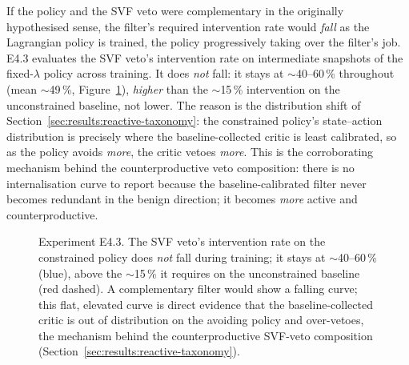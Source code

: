 \documentclass[11pt,a4paper]{report}
\begin{document}
If the policy and the SVF veto were complementary in the originally
hypothesised sense, the filter's required intervention rate would
\emph{fall} as the Lagrangian policy is trained, the policy
progressively taking over the filter's job. E4.3 evaluates the SVF
veto's intervention rate on intermediate snapshots of the
fixed-$\lambda$ policy across training. It does \emph{not} fall: it
stays at $\sim$40--60\,\% throughout (mean $\sim$49\,\%, Figure~\ref{fig:e4.3-internalisation}),
\emph{higher} than the $\sim$15\,\% intervention on the unconstrained
baseline, not lower. The reason is the distribution shift of
Section~\ref{sec:results:reactive-taxonomy}: the constrained policy's
state--action distribution is precisely where the baseline-collected
critic is least calibrated, so as the policy avoids \emph{more}, the
critic vetoes \emph{more}. This is the corroborating mechanism behind
the counterproductive veto composition: there is no internalisation
curve to report because the baseline-calibrated filter never becomes
redundant in the benign direction; it becomes \emph{more} active and
counterproductive.

\begin{figure}[htbp]
\centering
{}
\caption{Experiment E4.3. The SVF veto's intervention rate on the
constrained policy does \emph{not} fall during training; it stays at
$\sim$40--60\,\% (blue), above the $\sim$15\,\% it requires on the
unconstrained baseline (red dashed). A complementary filter would show
a falling curve; this flat, elevated curve is direct evidence that the
baseline-collected critic is out of distribution on the avoiding
policy and over-vetoes, the mechanism behind the counterproductive
SVF-veto composition
(Section~\ref{sec:results:reactive-taxonomy}).}
\label{fig:e4.3-internalisation}
\end{figure}
\end{document}
